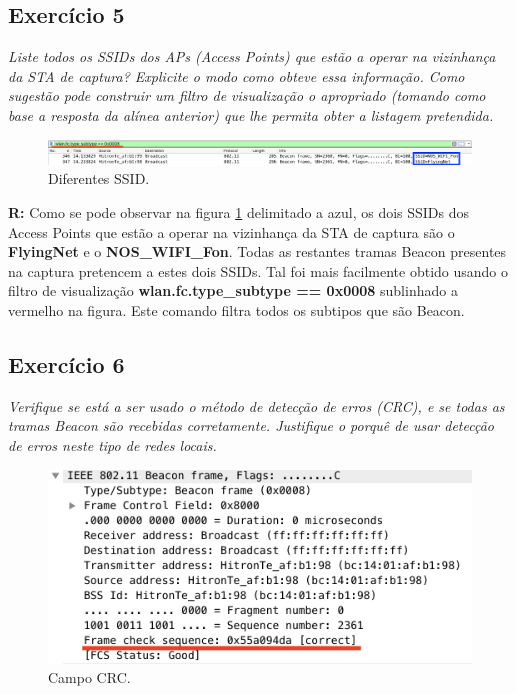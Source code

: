 \documentclass{llncs}
\begin{document}
\subsection{Exercício 5}
\emph{Liste todos os SSIDs dos APs (Access Points) que estão a operar na vizinhança da STA de captura? Explicite o modo como obteve essa informação. Como sugestão pode construir um filtro de visualização o apropriado (tomando como base a resposta da alínea anterior) que lhe permita obter a listagem pretendida.}

\begin{figure}[H]
\begin{center}
\includegraphics[scale=0.30]{5.png} 
\end{center}
\caption{\label{fig:5}Diferentes SSID.}
\end{figure} 
\par
\textbf{R:} Como se pode observar na figura \ref{fig:5} delimitado a azul, os dois SSIDs dos Access Points que estão a operar na vizinhança da STA de captura são o \textbf{FlyingNet} e o \textbf{NOS\_WIFI\_Fon}. Todas as restantes tramas Beacon presentes na captura pretencem a estes dois SSIDs. Tal foi mais facilmente obtido usando o filtro de visualização \textbf{wlan.fc.type\_subtype == 0x0008} sublinhado a vermelho na figura. Este comando filtra todos os subtipos que são Beacon.


\subsection{Exercício 6}
\emph{Verifique se está a ser usado o método de detecção de erros (CRC), e se todas as tramas Beacon são recebidas corretamente. Justifique o porquê de usar detecção de erros neste tipo de redes locais.}
\begin{figure}[H]
\begin{center}
\includegraphics[scale=0.30]{6.png} 
\end{center}
\caption{\label{fig:6} Campo CRC.}
\end{figure} 
\end{document}

